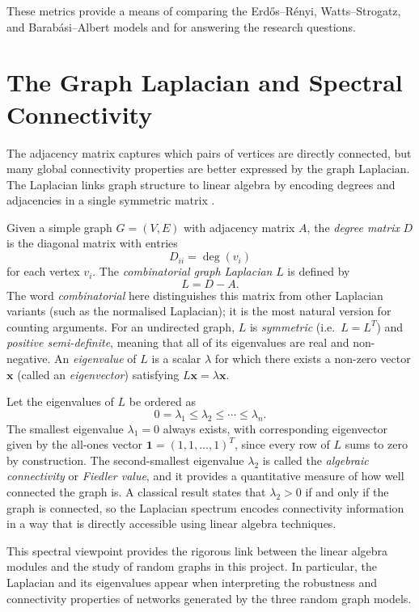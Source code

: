 \documentclass[12pt, a4paper]{report}
\theoremstyle{definition}
\theoremstyle{plain}
\theoremstyle{remark}
\begin{document}
These metrics provide a means of comparing the 
Erd\H{o}s--R\'enyi, Watts--Strogatz, and Barab\'asi--Albert 
models and for answering the research questions.

\section{The Graph Laplacian and Spectral Connectivity}
\label{sec:laplacian}

The adjacency matrix captures which pairs of vertices are
directly connected, but many global connectivity properties
are better expressed by the graph Laplacian. The Laplacian
links graph structure to linear algebra by encoding degrees
and adjacencies in a single symmetric matrix \cite{hofstad2017}.

Given a simple graph $G = (V,E)$ with adjacency matrix $A$, 
the \emph{degree matrix} $D$ is the diagonal matrix with entries
\[
  D_{ii} = \deg(v_i)
\]
for each vertex $v_i$. The \emph{combinatorial graph Laplacian}
$L$ is defined by
\[
  L = D - A.
\]
The word \emph{combinatorial} here distinguishes this matrix
from other Laplacian variants (such as the normalised
Laplacian); it is the most natural version for counting
arguments. For an undirected graph, $L$ is \emph{symmetric}
(i.e.\ $L = L^T$) and \emph{positive semi-definite}, meaning
that all of its eigenvalues are real and non-negative.
An \emph{eigenvalue} of $L$ is a scalar $\lambda$ for which
there exists a non-zero vector $\mathbf{x}$ (called an
\emph{eigenvector}) satisfying $L\mathbf{x} = \lambda\mathbf{x}$.

Let the eigenvalues of $L$ be ordered as
\[
  0 = \lambda_1 \le \lambda_2 \le \cdots \le \lambda_n.
\]
The smallest eigenvalue $\lambda_1 = 0$ always exists, with 
corresponding eigenvector given by the all-ones vector
$\mathbf{1} = (1, 1, \dots, 1)^T$, since every row of $L$
sums to zero by construction. The 
second-smallest eigenvalue $\lambda_2$ is called the
\emph{algebraic connectivity} or \emph{Fiedler value}, and it
provides a quantitative measure of how well connected the graph
is. A classical result states that $\lambda_2 > 0$ if and only
if the graph is connected, so the Laplacian spectrum encodes
connectivity information in a way that is directly accessible
using linear algebra techniques.

This spectral viewpoint provides the rigorous link between 
the linear algebra modules and the study of random graphs 
in this project. In particular, the Laplacian and its 
eigenvalues appear when interpreting the robustness and 
connectivity properties of networks generated by the three 
random graph models.
\end{document}

